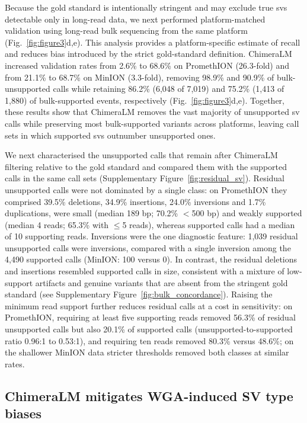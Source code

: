 \documentclass[pdflatex,lineno]{sn-jnl}%
\newif\ifrevisedtext
\newcommand{\chg}[1]{\ifrevisedtext\textcolor{revcolor}{#1}\else#1\fi}
\begin{document}
Because the gold standard is intentionally stringent and may exclude true \glspl{sv} detectable only in long-read data, we next performed platform-matched validation using long-read bulk sequencing from the same platform (Fig.~\ref{fig:figure3}d,e).
This analysis provides a platform-specific estimate of recall and reduces bias introduced by the strict gold-standard definition.
\chg{ChimeraLM increased validation rates from 2.6\% to 68.6\% on PromethION (26.3-fold) and from 21.1\% to 68.7\% on MinION (3.3-fold), removing 98.9\% and 90.9\% of bulk-unsupported calls while retaining 86.2\% (6,048 of 7,019) and 75.2\% (1,413 of 1,880) of bulk-supported events, respectively (Fig.~\ref{fig:figure3}d,e).
	Together, these results show that ChimeraLM removes the vast majority of unsupported \gls{sv} calls while preserving most bulk-supported variants across platforms, leaving call sets in which supported \glspl{sv} outnumber unsupported ones.}

\chg{We next characterised the unsupported calls that remain after ChimeraLM filtering relative to the gold standard and compared them with the supported calls in the same call sets (Supplementary Figure~\ref{fig:residual_sv}).
	Residual unsupported calls were not dominated by a single class: on PromethION they comprised 39.5\% deletions, 34.9\% insertions, 24.0\% inversions and 1.7\% duplications, were small (median 189 bp; 70.2\% $<$500 bp) and weakly supported (median 4 reads; 65.3\% with $\leq$5 reads), whereas supported calls had a median of 10 supporting reads.
	Inversions were the one diagnostic feature: 1,039 residual unsupported calls were inversions, compared with a single inversion among the 4,490 supported calls (MinION: 100 versus 0).
	In contrast, the residual deletions and insertions resembled supported calls in size, consistent with a mixture of low-support artifacts and genuine variants that are absent from the stringent gold standard (see Supplementary Figure~\ref{fig:bulk_concordance}).
	Raising the minimum read support further reduces residual calls at a cost in sensitivity: on PromethION, requiring at least five supporting reads removed 56.3\% of residual unsupported calls but also 20.1\% of supported calls (unsupported-to-supported ratio 0.96:1 to 0.53:1), and requiring ten reads removed 80.3\% versus 48.6\%; on the shallower MinION data stricter thresholds removed both classes at similar rates.}

\subsection*{ChimeraLM mitigates WGA-induced SV type biases}
\end{document}
